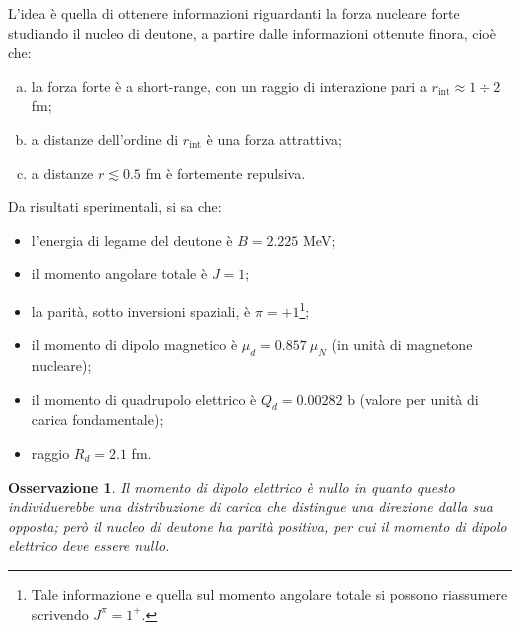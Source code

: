 \documentclass[11pt, a4paper]{scrartcl}
\theoremstyle{style}
\newtheorem{osservazione}{Osservazione}[section]
\numberwithin{equation}{subsection}
\begin{document}
L'idea \`e quella di ottenere informazioni riguardanti la forza nucleare forte studiando il nucleo di deutone, a partire dalle informazioni ottenute finora, cio\`e che:
\begin{enumerate}[(a).]
	\item la forza forte \`e a short-range, con un raggio di interazione pari a $r_\text{int}\approx 1 \div 2$ fm;
	\item a distanze dell'ordine di $r_\text{int}$ \`e una forza attrattiva;
	\item a distanze $r\lesssim 0.5$ fm \`e fortemente repulsiva.
\end{enumerate}
Da risultati sperimentali, si sa che:
\begin{itemize}
	\item l'energia di legame del deutone \`e $B = 2.225$ MeV;
	\item il momento angolare totale \`e $J=1$;
	\item la parit\`a, sotto inversioni spaziali, \`e $\pi = +1$\footnote{Tale informazione e quella sul momento angolare totale si possono riassumere scrivendo $J^\pi = 1^+$.};
	\item il momento di dipolo magnetico \`e $\mu _d = 0.857 \ \mu _N$ (in unit\`a di magnetone nucleare);
	\item il momento di quadrupolo elettrico \`e $Q_d = 0.00282\text{ b}$ (valore per unit\`a di carica fondamentale);
	\item raggio $R_d = 2.1$ fm.
\end{itemize}
\begin{osservazione}
Il momento di dipolo elettrico \`e nullo in quanto questo individuerebbe una distribuzione di carica che distingue una direzione dalla sua opposta; per\`o il nucleo di deutone ha parit\`a positiva, per cui il momento di dipolo elettrico deve essere nullo.
\end{osservazione}
\end{document}
